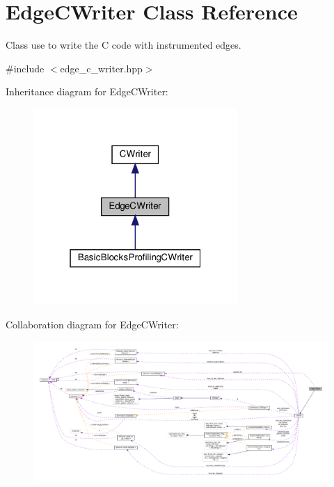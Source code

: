 \hypertarget{classEdgeCWriter}{}\section{Edge\+C\+Writer Class Reference}
\label{classEdgeCWriter}


Class use to write the C code with instrumented edges.  




{\ttfamily \#include $<$edge\+\_\+c\+\_\+writer.\+hpp$>$}



Inheritance diagram for Edge\+C\+Writer\+:
\nopagebreak
\begin{figure}[H]
\begin{center}
\leavevmode
\includegraphics[width=220pt]{d2/de6/classEdgeCWriter__inherit__graph}
\end{center}
\end{figure}


Collaboration diagram for Edge\+C\+Writer\+:
\nopagebreak
\begin{figure}[H]
\begin{center}
\leavevmode
\includegraphics[width=350pt]{de/d7a/classEdgeCWriter__coll__graph}
\end{center}
\end{figure}
